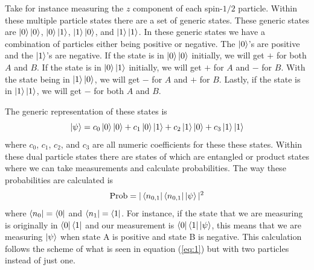 \documentclass[twocolumn]{article}
\begin{document}
\newline
Take for instance measuring the $z$ component of each spin-$1/2$ particle. Within these multiple particle states there are a set of generic states. These generic states are $\ket{0}\ket{0}$, $\ket{0}\ket{1}$, $\ket{1}\ket{0}$, and $\ket{1}\ket{1}$. In these generic states we have a combination of particles either being positive or negative. The $\ket{0}$'s are positive and the $\ket{1}$'s are negative. If the state is in $\ket{0}\ket{0}$ initially, we will get $+$ for both $A$ and $B$. If the state is in $\ket{0}\ket{1}$ initially, we will get $+$ for $A$ and $-$ for $B$. With the state being in $\ket{1}\ket{0}$, we will get $-$ for $A$ and $+$ for $B$. Lastly, if the state is in $\ket{1}\ket{1}$, we will get $-$ for both $A$ and $B$.

The generic representation of these states is
\begin{equation}\label{eq:9}
\ket{\psi}=c_0\ket{0}\ket{0}+c_1\ket{0}\ket{1}+c_2\ket{1}\ket{0}+c_3\ket{1}\ket{1}
\end{equation}
where $c_0$, $c_1$, $c_2$, and $c_3$ are all numeric coefficients for these these states. Within these dual particle states there are states of which are entangled or product states where we can take measurements and calculate probabilities. The way these probabilities are calculated is
\begin{equation}\label{eq:10}
\text{Prob}=|\bra{n_{0,1}}\bra{n_{0,1}}\ket{\psi}|^2
\end{equation}
where $\bra{n_0}=\bra{0}$ and $\bra{n_1}=\bra{1}$. For instance, if the state that we are measuring is originally in $\bra{0}\bra{1}$ and our measurement is $\bra{0}\bra{1}\ket{\psi}$, this means that we are measuring $\ket{\psi}$ when state A is positive and state B is negative. This calculation follows the scheme of what is seen in equation (\ref{eq:1}) but with two particles instead of just one.
\end{document}
